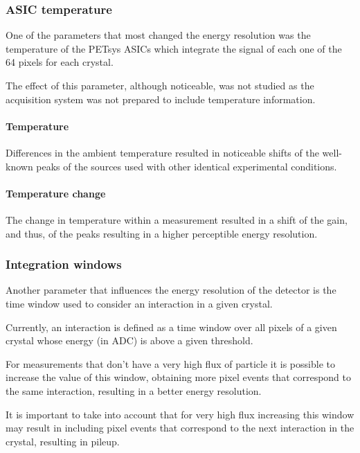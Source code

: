 \subsubsection{ASIC temperature}

One of the parameters that most changed the energy resolution was the temperature of the PETsys \ac{ASIC}s which integrate the signal of each one of the 64 pixels for each crystal.

The effect of this parameter, although noticeable, was not studied as the acquisition system was not prepared to include temperature information.

\paragraph*{Temperature}

Differences in the ambient temperature resulted in noticeable shifts of the well-known peaks of the sources used with other identical experimental conditions.

\paragraph*{Temperature change}

The change in temperature within a measurement resulted in a shift of the gain, and thus, of the peaks resulting in a higher perceptible energy resolution.

\subsubsection{Integration windows}

Another parameter that influences the energy resolution of the detector is the time window used to consider an interaction in a given crystal.

Currently, an interaction is defined as a time window over all pixels of a given crystal whose energy (in ADC) is above a given threshold.

For measurements that don't have a very high flux of particle it is possible to increase the value of this window, obtaining more pixel events that correspond to the same interaction, resulting in a better energy resolution.

It is important to take into account that for very high flux increasing this window may result in including pixel events that correspond to the next interaction in the crystal, resulting in pileup.

